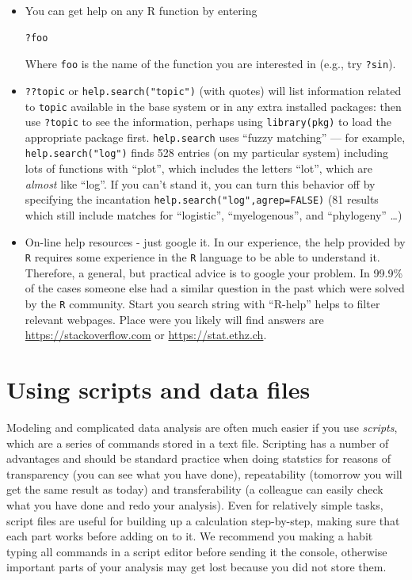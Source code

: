 \documentclass[11pt,]{article}
\begin{document}
\begin{itemize}
\item
  You can get help on any R function by entering

\begin{verbatim}
?foo
\end{verbatim}

  Where \texttt{foo} is the name of the function you are interested in (e.g., try \texttt{?sin}).
\item
  \texttt{??topic} or \texttt{help.search("topic")}
  (with quotes) will list information related to \texttt{topic} available in the base system or in any extra installed packages: then use \texttt{?topic} to see the information, perhaps using \texttt{library(pkg)} to load the appropriate package first. \texttt{help.search} uses ``fuzzy matching'' --- for example,
  \texttt{help.search("log")} finds 528 entries (on my particular system) including lots of functions with ``plot'', which includes the letters ``lot'', which
  are \emph{almost} like ``log''. If you can't stand it, you can turn this behavior off by specifying the incantation \texttt{help.search("log",agrep=FALSE)} (81 results which still include matches for ``logistic'', ``myelogenous'', and ``phylogeny'' \ldots{})
\item
  On-line help resources - just google it.
  In our experience, the help provided by \texttt{R} requires some experience in the \texttt{R} language to be able to understand it. Therefore, a general, but practical advice is to google your problem. In 99.9\% of the cases someone else had a similar question in the past which were solved by the \texttt{R} community. Start you search string with ``R-help'' helps to filter relevant webpages. Place were you likely will find answers are \url{https://stackoverflow.com} or \url{https://stat.ethz.ch}.
\end{itemize}

\hypertarget{using-scripts-and-data-files}{%
\section{Using scripts and data files}\label{using-scripts-and-data-files}}

Modeling and complicated data analysis are often much easier if you use \emph{scripts}, which are a series of commands stored in a text file. Scripting has a number of advantages and should be standard practice when doing statstics for reasons of transparency (you can see what you have done), repeatability (tomorrow you will get the same result as today) and transferability (a colleague can easily check what you have done and redo your analysis). Even for relatively simple tasks, script files are useful for building up a calculation step-by-step, making sure that each part works before adding on to it. We recommend you making a habit typing all commands in a script editor before sending it the console, otherwise important parts of your analysis may get lost because you did not store them.
\end{document}

